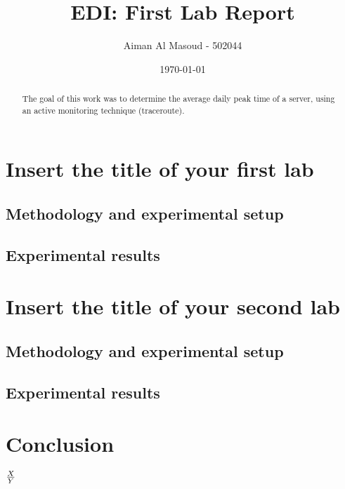 \documentclass[a4paper,10pt]{article}
\begin{document}
\title{EDI: First Lab Report}
\author{Aiman Al Masoud - 502044}
\date{\today}

\maketitle

\begin{abstract}
The goal of this work was to determine the average daily peak time of a server, using an active monitoring technique (traceroute).
\end{abstract}

\clearpage

\setcounter{page}{1}

\section{Insert the title of your first lab}
\subsection{Methodology and experimental setup}
\subsection{Experimental results}

\section{Insert the title of your second lab}
\subsection{Methodology and experimental setup}
\subsection{Experimental results}
\section{Conclusion}

$ X \over Y  $

\end{document}
